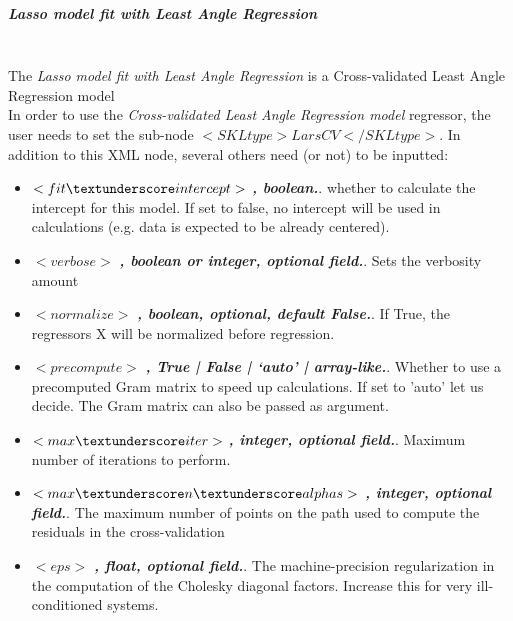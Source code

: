 \subparagraph{Lasso model fit with Least Angle Regression }
\mbox{}
\\The \textit{Lasso model fit with Least Angle Regression} is a Cross-validated Least Angle Regression model
\\In order to use the \textit{Cross-validated Least Angle Regression model} regressor, the user needs to set the sub-node $<SKLtype>LarsCV</SKLtype>$.
In addition to this XML node, several others need (or not) to be inputted:
\begin{itemize}
  \item $<fit \textunderscore intercept>$ \textbf{\textit{, boolean.}}. whether to calculate the intercept for this model. If set to false, no intercept will be used in calculations (e.g. data is expected to be already centered).
  \item $<verbose>$ \textbf{\textit{, boolean or integer, optional field.}}. Sets the verbosity amount
  \item $<normalize>$ \textbf{\textit{, boolean, optional, default False.}}. If True, the regressors X will be normalized before regression.
  \item $<precompute>$ \textbf{\textit{, True | False | ‘auto’ | array-like.}}. Whether to use a precomputed Gram matrix to speed up calculations. If set to 'auto' let us decide. The Gram matrix can also be passed as argument.
  \item $<max \textunderscore iter>$ \textbf{\textit{, integer, optional field.}}. Maximum number of iterations to perform.
  \item $<max \textunderscore n \textunderscore alphas>$ \textbf{\textit{, integer, optional field.}}. The maximum number of points on the path used to compute the residuals in the cross-validation
  \item $<eps>$ \textbf{\textit{, float, optional field.}}. The machine-precision regularization in the computation of the Cholesky diagonal factors. Increase this for very ill-conditioned systems.
\end{itemize}

